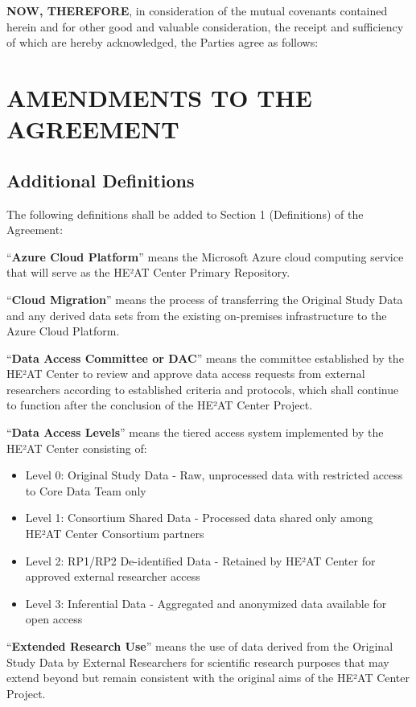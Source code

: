 \documentclass[12pt,letterpaper]{article}
\begin{document}
\textbf{NOW, THEREFORE}, in consideration of the mutual covenants contained herein and for other good and valuable consideration, the receipt and sufficiency of which are hereby acknowledged, the Parties agree as follows:

\section{AMENDMENTS TO THE AGREEMENT}

\subsection{Additional Definitions}

The following definitions shall be added to Section 1 (Definitions) of the Agreement:

``\textbf{Azure Cloud Platform}'' means the Microsoft Azure cloud computing service that will serve as the HE²AT Center Primary Repository.

``\textbf{Cloud Migration}'' means the process of transferring the Original Study Data and any derived data sets from the existing on-premises infrastructure to the Azure Cloud Platform.

``\textbf{Data Access Committee or DAC}'' means the committee established by the HE²AT Center to review and approve data access requests from external researchers according to established criteria and protocols, which shall continue to function after the conclusion of the HE²AT Center Project.

``\textbf{Data Access Levels}'' means the tiered access system implemented by the HE²AT Center consisting of:
\begin{itemize}
   \item Level 0: Original Study Data - Raw, unprocessed data with restricted access to Core Data Team only
   \item Level 1: Consortium Shared Data - Processed data shared only among HE²AT Center Consortium partners
   \item Level 2: RP1/RP2 De-identified Data - Retained by HE²AT Center for approved external researcher access
   \item Level 3: Inferential Data - Aggregated and anonymized data available for open access
\end{itemize}

``\textbf{Extended Research Use}'' means the use of data derived from the Original Study Data by External Researchers for scientific research purposes that may extend beyond but remain consistent with the original aims of the HE²AT Center Project.
\end{document}
